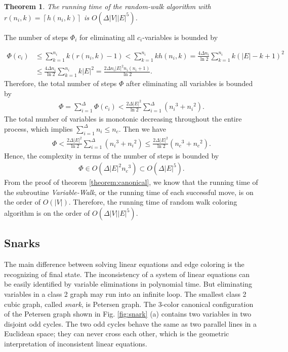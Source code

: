 \documentclass[11pt]{article}
\newtheorem{theorem}{Theorem}[section]
\newenvironment{proof}[1][Proof]{\begin{trivlist}
\item[\hskip \labelsep {\bfseries #1}]}{\end{trivlist}}
\newcommand{\qed}{\nobreak \ifvmode \relax \else
      \ifdim\lastskip<1.5em \hskip-\lastskip
      \hskip1.5em plus0em minus0.5em \fi \nobreak
      \vrule height0.75em width0.5em depth0.25em\fi}
\begin{document}
\begin{theorem} 
The running time of the random-walk algorithm with $r(n_i,k)=\left\lceil h(n_i,k) \right\rceil$ is $O(\Delta|V||E|^5)$.
\end{theorem}
\begin{proof}
The number of steps $\Phi_i$ for eliminating all $c_i$-variables is bounded by
\end{proof}
\begin{align}
 \Phi (c_i) &\leq \sum_{k=1}^{n_i}k(r(n_i,k)-1) < \sum_{k=1}^{n_i}kh(n_i,k) =  \frac{4\Delta n_i}{\ln{2}}\sum_{k=1}^{n_i}k(|E|-k+1)^2  \nonumber \\
&\leq  \frac{4\Delta n_i}{\ln{2}} \sum_{k=1}^{n_i}k|E|^2 = \frac{2\Delta n_i|E|^2n_i(n_i+1)}{\ln{2}}.
\end{align}
Therefore, the total number of steps $\Phi$ after eliminating all variables is bounded by
\begin{align}
\Phi = \sum_{i=1}^{\Delta} \Phi (c_i) < \frac{2\Delta |E|^2}{\ln{2}}  \sum_{i=1}^{\Delta}({n_i}^{3}+{n_i}^{2}) .
\end{align} 
The total number of variables is monotonic decreasing throughout the entire process, which implies $\sum_{i=1}^{\Delta}n_i \leq n_c$. Then we have
\begin{align}
\Phi <\frac{2\Delta |E|^2}{\ln{2}}   \sum_{i=1}^{\Delta}({n_i}^{3}+{n_i}^{2}) \leq \frac{2\Delta |E|^2}{\ln{2}}({n_c}^{3}+{n_c}^{2}) . 
\end{align} 
Hence, the complexity in terms of the number of steps is bounded by 
\begin{align}
\Phi \in O(\Delta |E|^2{n_c}^3)\subset O(\Delta |E|^5). 
\end{align}
From the proof of theorem \ref{theorem:canonical}, we know that the running time of the subroutine {\it Variable-Walk}, or the running time of each successful move, is on the order of $O(|V|)$. Therefore, the running time of random walk coloring algorithm is on the order of $O(\Delta|V||E|^5)$.\qed



\subsection{Snarks}
The main difference between solving linear equations and edge coloring is the recognizing of final state. The inconsistency of a system of linear equations can be easily identified by variable eliminations in polynomial time. But eliminating variables in a class 2 graph may run into an infinite loop. The smallest class 2 cubic graph, called {\it snark}, is Petersen graph. The 3-color canonical configuration of the Petersen graph shown in Fig. \ref{fig:snark} (a) contains two variables in two disjoint odd cycles. The two odd cycles behave the same as two parallel lines in a Euclidean space; they can never cross each other, which is the geometric interpretation of inconsistent linear equations.
 
\end{document}
